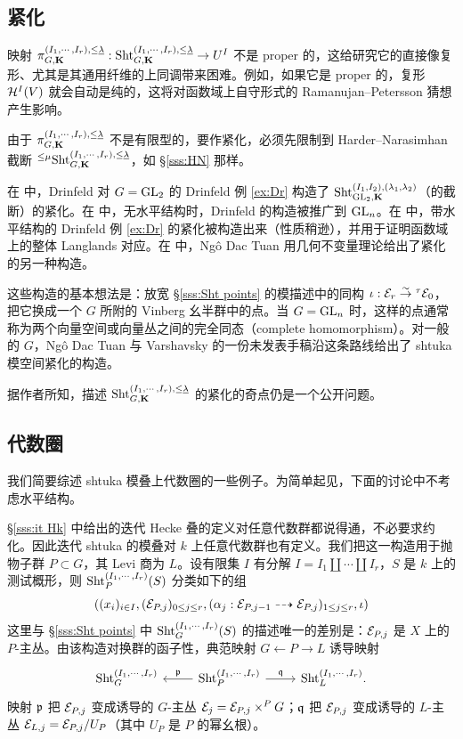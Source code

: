 \subsection{紧化}
映射 $\pi^{(I_{1},\cdots, I_{r}),\le \underline{\lambda}}_{G,\mathbf{K}}: \textup{Sht}^{(I_{1},\cdots, I_{r}),\le \underline{\lambda}}_{G,\mathbf{K}}\to U^{I}$ 不是 proper 的，这给研究它的直接像复形、尤其是其通用纤维的上同调带来困难。例如，如果它是 proper 的，复形 $\mathcal{H}^{I}(V)$ 就会自动是纯的，这将对函数域上自守形式的 Ramanujan–Petersson 猜想产生影响。

由于 $\pi^{(I_{1},\cdots, I_{r}),\le \underline{\lambda}}_{G,\mathbf{K}}$ 不是有限型的，要作紧化，必须先限制到 Harder–Narasimhan 截断 ${}^{\le \mu}\textup{Sht}^{(I_{1},\cdots, I_{r}),\le \underline{\lambda}}_{G,\mathbf{K}}$，如 \S\ref{sss:HN} 那样。

在 \cite{Dr-comp} 中，Drinfeld 对 $G=\textup{GL}_{2}$ 的 Drinfeld 例 \ref{ex:Dr} 构造了 $\textup{Sht}^{(I_{1},I_{2}),(\lambda_{1},\lambda_{2})}_{\textup{GL}_{2}, \mathbf{K}}$（的截断）的紧化。在 \cite{Laff-comp} 中，无水平结构时，Drinfeld 的构造被推广到 $\textup{GL}_{n}$。在 \cite{LLaff} 中，带水平结构的 Drinfeld 例 \ref{ex:Dr} 的紧化被构造出来（性质稍逊），并用于证明函数域上的整体 Langlands 对应。在 \cite{NDT} 中，Ng\^o Dac Tuan 用几何不变量理论给出了紧化的另一种构造。

这些构造的基本想法是：放宽 \S\ref{sss:Sht points} 的模描述中的同构 $\iota: \mathcal{E}_{r}\stackrel{\sim}{\to} {}^{\tau}\mathcal{E}_{0}$，把它换成一个 $G$ 所附的 Vinberg 幺半群中的点。当 $G=\textup{GL}_{n}$ 时，这样的点通常称为两个向量空间或向量丛之间的完全同态（complete homomorphism）。对一般的 $G$，Ng\^o Dac Tuan 与 Varshavsky 的一份未发表手稿沿这条路线给出了 shtuka 模空间紧化的构造。

据作者所知，描述 $\textup{Sht}^{(I_{1},\cdots, I_{r}),\le\underline{\lambda}}_{G,\mathbf{K}}$ 的紧化的奇点仍是一个公开问题。

\subsection{代数圈}
我们简要综述 shtuka 模叠上代数圈的一些例子。为简单起见，下面的讨论中不考虑水平结构。

\S\ref{sss:it Hk} 中给出的迭代 Hecke 叠的定义对任意代数群都说得通，不必要求约化。因此迭代 shtuka 的模叠对 $k$ 上任意代数群也有定义。我们把这一构造用于抛物子群 $P\subset G$，其 Levi 商为 $L$。设有限集 $I$ 有分解 $I=I_{1}\coprod \cdots \coprod I_{r}$，$S$ 是 $k$ 上的测试概形，则 $\textup{Sht}^{(I_{1},\cdots, I_{r})}_{P}(S)$ 分类如下的组
$$((x_{i})_{i\in I}, (\mathcal{E}_{P,j})_{0\le j\le r}, (\alpha_{j}: \mathcal{E}_{P, j-1}\dashrightarrow\mathcal{E}_{P, j})_{1\le j\le r}, \iota)$$
这里与 \S\ref{sss:Sht points} 中 $\textup{Sht}^{(I_{1},\cdots, I_{r})}_{G}(S)$ 的描述唯一的差别是：$\mathcal{E}_{P,j}$ 是 $X$ 上的 $P$-主丛。由该构造对换群的函子性，典范映射 $G\leftarrow{P}\to L$ 诱导映射
\begin{equation*}
\begin{tikzcd}
\Sht_{G}^{(I_{1},\cdots, I_{r})} & \Sht_{P}^{(I_{1},\cdots, I_{r})} \arrow[l,"\frp"'] \arrow[r,"\frq"] & \Sht_{L}^{(I_{1},\cdots, I_{r})}.
\end{tikzcd}
\end{equation*}
映射 $\mathfrak{p}$ 把 $\mathcal{E}_{P,j}$ 变成诱导的 $G$-主丛 $\mathcal{E}_{j}=\mathcal{E}_{P,j}\times^{P}G$；$\mathfrak{q}$ 把 $\mathcal{E}_{P,j}$ 变成诱导的 $L$-主丛 $\mathcal{E}_{L,j}=\mathcal{E}_{P,j}/U_{P}$（其中 $U_{P}$ 是 $P$ 的幂幺根）。

